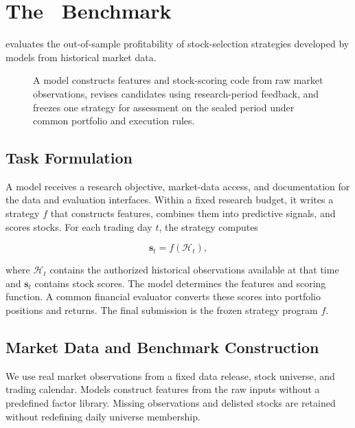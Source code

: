 \section{The \BenchmarkName\ Benchmark}
\label{sec:benchmark}

\BenchmarkName{} evaluates the out-of-sample profitability of stock-selection strategies developed by models from historical market data.

\begin{figure}[t]
    \centering
    \caption{A model constructs features and stock-scoring code from raw market observations, revises candidates using research-period feedback, and freezes one strategy for assessment on the sealed period under common portfolio and execution rules.}
    \label{fig:pipeline}
\end{figure}

\subsection{Task Formulation}
\label{sec:task}

A model receives a research objective, market-data access, and documentation for the data and evaluation interfaces. Within a fixed research budget, it writes a strategy $f$ that constructs features, combines them into predictive signals, and scores stocks. For each trading day $t$, the strategy computes

\[
\mathbf{s}_t=f(\mathcal{H}_t),
\]

where $\mathcal{H}_t$ contains the authorized historical observations available at that time and $\mathbf{s}_t$ contains stock scores. The model determines the features and scoring function. A common financial evaluator converts these scores into portfolio positions and returns. The final submission is the frozen strategy program $f$.

\subsection{Market Data and Benchmark Construction}
\label{sec:data}

We use real market observations from a fixed data release, stock universe, and trading calendar. Models construct features from the raw inputs without a predefined factor library. Missing observations and delisted stocks are retained without redefining daily universe membership.

